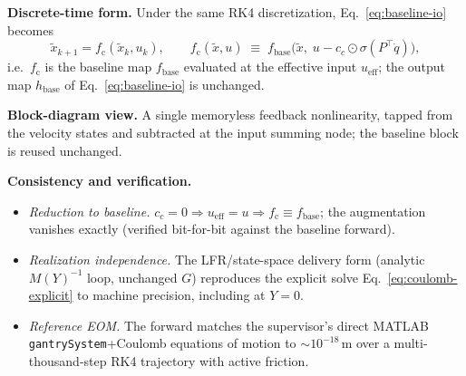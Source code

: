 \documentclass[11pt]{article}
\newcommand{\xb}{\tilde{x}}
\newcommand{\yh}{\hat{y}}
\newcommand{\fb}{f_{\mathrm{base}}}
\newcommand{\hb}{h_{\mathrm{base}}}
\newcommand{\fc}{f_{\mathrm{c}}}
\newcommand{\ueff}{u_{\mathrm{eff}}}
\newcommand{\Fcs}{F_c^{\mathrm{s}}}
\begin{document}
\medskip\noindent\textbf{Discrete-time form.}\quad
Under the same RK4 discretization, Eq.~\eqref{eq:baseline-io} becomes
\begin{equation}
  \xb_{k+1} = \fc(\xb_k, u_k), \qquad
  \fc(\xb, u) \;\equiv\; \fb\!\big(\xb,\; u - c_c \odot \sigma(P^\top \dot q)\big),
  \label{eq:coulomb-disc}
\end{equation}
i.e.\ $\fc$ is the baseline map $\fb$ evaluated at the effective input $\ueff$; the output
map $\hb$ of Eq.~\eqref{eq:baseline-io} is unchanged.

\medskip\noindent\textbf{Block-diagram view.}\quad
A single memoryless feedback nonlinearity, tapped from the velocity states and subtracted
at the input summing node; the baseline block is reused unchanged.
\begin{center}
\end{center}

\medskip\noindent\textbf{Consistency and verification.}\quad
\begin{itemize}
  \item \emph{Reduction to baseline.} $c_c = 0 \Rightarrow \ueff = u \Rightarrow \fc \equiv \fb$;
        the augmentation vanishes exactly (verified bit-for-bit against the baseline
        forward).
  \item \emph{Realization independence.} The LFR/state-space delivery form (analytic
        $M(Y)^{-1}$ loop, unchanged $G$) reproduces the explicit solve
        Eq.~\eqref{eq:coulomb-explicit} to machine precision, including at $Y=0$.
  \item \emph{Reference EOM.} The forward matches the supervisor's direct MATLAB
        \texttt{gantrySystem}+Coulomb equations of motion to $\sim\!10^{-18}$\,m over a
        multi-thousand-step RK4 trajectory with active friction.
\end{itemize}
\end{document}
